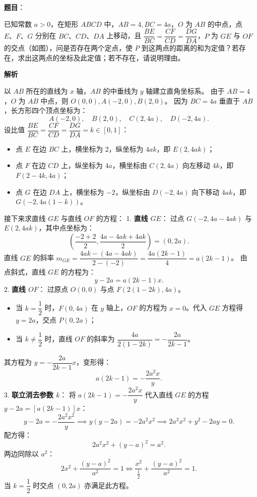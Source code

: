 \begin{answer}

\textbf{题目}：

已知常数 $a > 0$，在矩形 $ABCD$ 中，$AB = 4, BC = 4a$，$O$ 为 $AB$ 的中点，点 $E\text{、}F\text{、}G$ 分别在 $BC\text{、}CD\text{、}DA$ 上移动，且 $\dfrac{BE}{BC} = \dfrac{CF}{CD} = \dfrac{DG}{DA}$，$P$ 为 $GE$ 与 $OF$ 的交点（如图），问是否存在两个定点，使 $P$ 到这两点的距离的和为定值？若存在，求出这两点的坐标及此定值；若不存在，请说明理由。
\nopagebreak[4]
\begin{center}\end{center}
\nopagebreak[4]
\textbf{解析}

以 $AB$ 所在的直线为 $x$ 轴，$AB$ 的中垂线为 $y$ 轴建立直角坐标系。
由于 $AB = 4$，$O$ 为 $AB$ 中点，则 $O(0, 0), A(-2, 0), B(2, 0)$。
因为 $BC = 4a$ 垂直于 $AB$，长方形四个顶点坐标为：
\nopagebreak[4]
\[A(-2, 0), \quad B(2, 0), \quad C(2, 4a), \quad D(-2, 4a).\]
设比值 $\dfrac{BE}{BC} = \dfrac{CF}{CD} = \dfrac{DG}{DA} = k \in [0, 1]$：
\begin{itemize}
\item 点 $E$ 在边 $BC$ 上，横坐标为 2，纵坐标为 $4ak$，即 $E(2, 4ak)$；
\item 点 $F$ 在边 $CD$ 上，纵坐标为 $4a$，横坐标由 $C(2, 4a)$ 向左移动 $4k$，即 $F(2 - 4k, 4a)$；
\item 点 $G$ 在边 $DA$ 上，横坐标为 $-2$，纵坐标由 $D(-2, 4a)$ 向下移动 $4ak$，即 $G(-2, 4a(1 - k))$。
\end{itemize}

接下来求直线 $GE$ 与直线 $OF$ 的方程：
1. \textbf{直线 $GE$}：
   过点 $G(-2, 4a - 4ak)$ 与 $E(2, 4ak)$，其中点坐标为：
\nopagebreak[4]
\[\left(\frac{-2 + 2}{2}, \frac{4a - 4ak + 4ak}{2}\right) = (0, 2a).\]
   直线 $GE$ 的斜率 $m_{GE} = \dfrac{4ak - (4a - 4ak)}{2 - (-2)} = \dfrac{4a(2k - 1)}{4} = a(2k - 1)$。
   由点斜式，直线 $GE$ 的方程为：
\nopagebreak[4]
\[y - 2a = a(2k - 1)x.\]
2. \textbf{直线 $OF$}：
   过原点 $O(0, 0)$ 与点 $F(2(1 - 2k), 4a)$。
\begin{itemize}
\item 当 $k = \dfrac{1}{2}$ 时，$F(0, 4a)$ 在 $y$ 轴上，$OF$ 的方程为 $x = 0$。代入 $GE$ 方程得 $y = 2a$，交点 $P(0, 2a)$；
\item 当 $k \ne \dfrac{1}{2}$ 时，直线 $OF$ 的斜率为 $\dfrac{4a}{2(1 - 2k)} = -\dfrac{2a}{2k - 1}$。
\end{itemize}
   其方程为 $y = -\dfrac{2a}{2k - 1}x$，变形得：
\nopagebreak[4]
\[a(2k - 1) = -\frac{2a^2 x}{y}.\]
3. \textbf{联立消去参数 $k$}：
   将 $a(2k - 1) = -\dfrac{2a^2 x}{y}$ 代入直线 $GE$ 的方程 $y - 2a = [a(2k - 1)]x$：
\nopagebreak[4]
\[y - 2a = -\frac{2a^2 x^2}{y} \implies y(y - 2a) = -2a^2 x^2 \implies 2a^2 x^2 + y^2 - 2ay = 0.\]
   配方得：
\nopagebreak[4]
\[2a^2 x^2 + (y - a)^2 = a^2.\]
   两边同除以 $a^2$：
\nopagebreak[4]
\[2x^2 + \frac{(y - a)^2}{a^2} = 1 \iff \frac{x^2}{\frac{1}{2}} + \frac{(y - a)^2}{a^2} = 1.\]
   当 $k = \dfrac{1}{2}$ 时交点 $(0, 2a)$ 亦满足此方程。


\end{answer}
